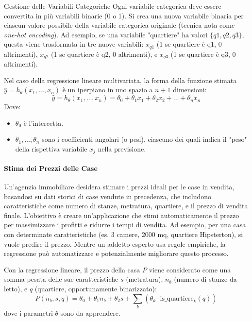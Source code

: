 \documentclass{article}
\begin{document}
\begin{notebox}{Gestione delle Variabili Categoriche}
    Ogni variabile categorica deve essere convertita in più variabili binarie (0 o 1). Si crea una nuova variabile binaria per ciascun valore possibile della variabile categorica originale (tecnica nota come \textit{one-hot encoding}). Ad esempio, se una variabile "quartiere" ha valori $\{q1, q2, q3\}$, questa viene trasformata in tre nuove variabili: $x_{q1}$ (1 se quartiere è q1, 0 altrimenti), $x_{q2}$ (1 se quartiere è q2, 0 altrimenti), e $x_{q3}$ (1 se quartiere è q3, 0 altrimenti).
\end{notebox}

Nel caso della regressione lineare multivariata, la forma della funzione stimata $\hat{y} = h_{\theta}(x_1, \dots, x_n)$ è un iperpiano in uno spazio a $n+1$ dimensioni:
$$ \hat{y} = h_{\theta}(x_1, \dots, x_n) = \theta_0 + \theta_1 x_1 + \theta_2 x_2 + \dots + \theta_n x_n $$
Dove:
\begin{itemize}
    \item $\theta_0$ è l'intercetta.
    \item $\theta_1, \dots, \theta_n$ sono i coefficienti angolari (o pesi), ciascuno dei quali indica il "peso" della rispettiva variabile $x_j$ nella previsione.
\end{itemize}

\paragraph{Stima dei Prezzi delle Case} Un'agenzia immobiliare desidera stimare i prezzi ideali per le case in vendita, basandosi su dati storici di case vendute in precedenza, che includono caratteristiche come numero di stanze, metratura, quartiere, e il prezzo di vendita finale. L'obiettivo è creare un'applicazione che stimi automaticamente il prezzo per massimizzare i profitti e ridurre i tempi di vendita.
Ad esempio, per una casa con determinate caratteristiche (es. 3 camere, 2000 mq, quartiere Hipsterton), si vuole predire il prezzo. Mentre un addetto esperto usa regole empiriche, la regressione può automatizzare e potenzialmente migliorare questo processo.

Con la regressione lineare, il prezzo della casa $P$ viene considerato come una somma pesata delle sue caratteristiche $s$ (metratura), $n_b$ (numero di stanze da letto), e $q$ (quartiere, opportunamente binarizzato):
$$ P(n_b, s, q) = \theta_0 + \theta_1 n_b + \theta_2 s + \sum_{k} (\theta_k \cdot \text{is\_quartiere}_k(q)) $$
dove i parametri $\theta$ sono da apprendere.
\end{document}
